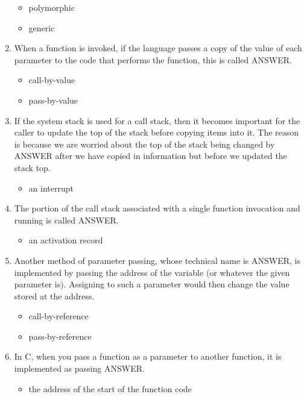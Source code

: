 \documentclass{exam}
\begin{document}
\begin{enumerate}
\begin{itemize}
\item polymorphic
\item generic
\end{itemize}
\item When a function is invoked, if the language passes a copy of the value of each parameter to the code that performs the function, this is called ANSWER.
\begin{itemize}
\item call-by-value
\item pass-by-value
\end{itemize}
\item If the system stack is used for a call stack, then it becomes important for the caller to update the top of the stack before copying items into it.  The reason is because we are worried about the top of the stack being changed by ANSWER after we have copied in information but before we updated the stack top.
\begin{itemize}
\item an interrupt
\end{itemize}
\item The portion of the call stack associated with a single function invocation and running is called ANSWER.
\begin{itemize}
\item an activation record
\end{itemize}
\item Another method of parameter passing, whose technical name is ANSWER, is implemented by passing the address of the variable (or whatever the given parameter is).  Assigning to such a parameter would then change the value stored at the address.
\begin{itemize}
\item call-by-reference
\item pass-by-reference
\end{itemize}
\item In C, when you pass a function as a parameter to another function, it is implemented as passing ANSWER.
\begin{itemize}
\item the address of the start of the function code
\end{itemize}
\end{enumerate}
\end{document}
